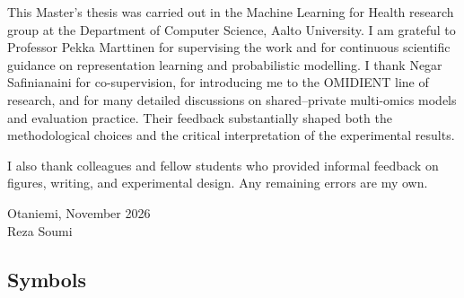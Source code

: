 

This Master's thesis was carried out in the Machine Learning for Health research group at the Department of Computer Science, Aalto University. I am grateful to Professor Pekka Marttinen for supervising the work and for continuous scientific guidance on representation learning and probabilistic modelling. I thank Negar Safinianaini for co-supervision, for introducing me to the OMIDIENT line of research, and for many detailed discussions on shared--private multi-omics models and evaluation practice. Their feedback substantially shaped both the methodological choices and the critical interpretation of the experimental results.

I also thank colleagues and fellow students who provided informal feedback on figures, writing, and experimental design. Any remaining errors are my own.

\vspace{5cm}
Otaniemi, November 2026\\

\vspace{5mm}
{\hfill Reza Soumi \hspace{1cm}}

\newpage

\thesistableofcontents


\subsection*{Symbols}

